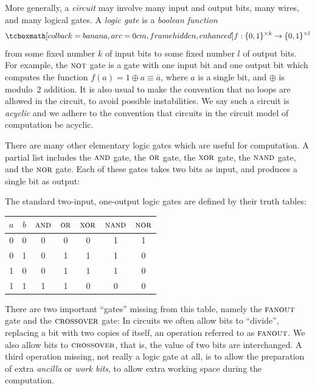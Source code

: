 More generally, a \emph{circuit} may involve many input and output bits, many
wires, and many logical gates. A \emph{logic gate} is a \emph{boolean
  function}
\begin{equation}
  \eqbox{f:\{0,1\}^{\times k} \rightarrow \{0,1\}^{\times l}}
\end{equation}
from some fixed number $k$ of input bits to some fixed number $l$ of output
bits.  For example, the $\textsc{not}$ gate is a gate with one input bit and one
output bit which computes the function $f(a) = 1\oplus a \equiv \overline{a}$,
where $a$ is a single bit, and $\oplus$ is modulo~$2$ addition.  It is also
usual to make the convention that no loops are allowed in the circuit, to
avoid possible instabilities. We say such a circuit is \emph{acyclic} and we
adhere to the convention that circuits in the circuit model of computation be
acyclic.

There are many other elementary logic gates which are useful for computation.
A partial list includes the $\textsc{and}$ gate, the $\textsc{or}$ gate, the $\textsc{xor}$ gate,
the $\textsc{nand}$ gate, and the $\textsc{nor}$ gate.  Each of these gates takes two bits
as input, and produces a single bit as output:

\begin{definition}\label{def:logic-gates}
  The standard two-input, one-output logic gates are defined by their truth
  tables:
  \begin{center}
    \begin{tabular}{cc|ccccc}
      \toprule
      $a$ & $b$ & $\textsc{and}$ & $\textsc{or}$ & $\textsc{xor}$ & $\textsc{nand}$ & $\textsc{nor}$ \\
      \midrule
      0 & 0 & 0 & 0 & 0 & 1 & 1 \\
      0 & 1 & 0 & 1 & 1 & 1 & 0 \\
      1 & 0 & 0 & 1 & 1 & 1 & 0 \\
      1 & 1 & 1 & 1 & 0 & 0 & 0 \\
      \bottomrule
    \end{tabular}
  \end{center}
\end{definition}

There are two important ``gates'' missing from this table, namely the
$\textsc{fanout}$ gate and the $\textsc{crossover}$ gate: In circuits we
often allow bits to ``divide'', replacing a bit with two copies of itself, an
operation referred to as $\textsc{fanout}$.  We also allow bits to
$\textsc{crossover}$, that is, the value of two bits are interchanged. A
third operation missing, not really a logic gate at all, is to allow the
preparation of extra \emph{ancilla} or \emph{work bits}, to allow extra
working space during the computation.


